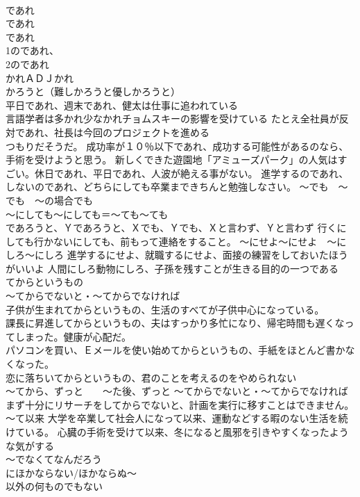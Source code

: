 \documentclass[8pt]{extreport}
\begin{document}
\begin{CJK}{UTF8}{min}
\\	であれ
\\	であれ
\\	であれ 
\\	1のであれ、
\\	2のであれ 
\\	かれＡＤＪかれ　
\\	かろうと（難しかろうと優しかろうと） 
\\	平日であれ、週末であれ、健太は仕事に追われている 
\\	言語学者は多かれ少なかれチョムスキーの影響を受けている たとえ全社員が反対であれ、社長は今回のプロジェクトを進める
\\	つもりだそうだ。 成功率が１０％以下であれ、成功する可能性があるのなら、手術を受けようと思う。 新しくできた遊園地「アミューズパーク」の人気はすごい。休日であれ、平日であれ、人波が絶える事がない。 進学するのであれ、しないのであれ、どちらにしても卒業まできちんと勉強しなさい。	～でも　～でも　～の場合でも 
\\	～にしても～にしても＝～ても～ても 
\\	であろうと、Ｙであろうと、Ｘでも、Ｙでも、Ｘと言わず、Ｙと言わず 行くにしても行かないにしても、前もって連絡をすること。 ～にせよ～にせよ　～にしろ～にしろ 進学するにせよ、就職するにせよ、面接の練習をしておいたほうがいいよ 人間にしろ動物にしろ、子孫を残すことが生きる目的の一つである
\\	てからというもの 
\\	～てからでないと・～てからでなければ	
\\	子供が生まれてからというもの、生活のすべてが子供中心になっている。 
\\	課長に昇進してからというもの、夫はすっかり多忙になり、帰宅時間も遅くなってしまった。健康が心配だ。 
\\	パソコンを買い、Ｅメールを使い始めてからというもの、手紙をほとんど書かなくなった。 
\\	恋に落ちいてからというもの、君のことを考えるのをやめられない 
\\	～てから、ずっと　　～た後、ずっと	～てからでないと・～てからでなければ 
\\	まず十分にリサーチをしてからでないと、計画を実行に移すことはできません。 ～て以来 大学を卒業して社会人になって以来、運動などする暇のない生活を続けている。 心臓の手術を受けて以来、冬になると風邪を引きやすくなったような気がする
\\	～でなくてなんだろう 
\\	にほかならない/ほかならぬ～ 
\\	以外の何ものでもない	

\end{CJK}
\end{document}

